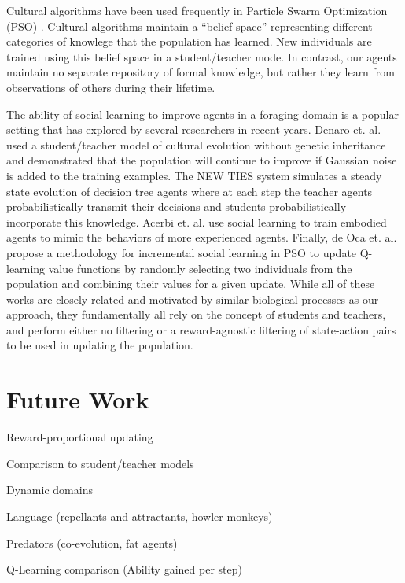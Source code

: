 \documentclass{acm_proc_article-sp}
\begin{document}
Cultural algorithms \cite{reynolds1994introduction} have been used frequently in Particle Swarm Optimization (PSO) \cite{kennedy1995particle}. Cultural algorithms maintain a ``belief space'' representing different categories of knowlege that the population has learned. New individuals are trained using this belief space in a student/teacher mode. In contrast, our agents maintain no separate repository of formal knowledge, but rather they learn from observations of others during their lifetime.

The ability of social learning to improve agents in a foraging domain is a popular setting that has explored by several researchers in recent years. Denaro et. al. \cite{denaro1996cultural} used a student/teacher model of cultural evolution without genetic inheritance and demonstrated that the population will continue to improve if Gaussian noise is added to the training examples. The NEW TIES system \cite{haasdijk2008social, vogt2010modeling} simulates a steady state evolution of decision tree agents where at each step the teacher agents probabilistically transmit their decisions and students probabilistically incorporate this knowledge. Acerbi et. al. \cite{acerbi2007social} use social learning to train embodied agents to mimic the behaviors of more experienced agents. Finally, de Oca et. al. \cite{de2011incremental} propose a methodology for incremental social learning in PSO to update Q-learning \cite{watkins1992q} value functions by randomly selecting two individuals from the population and combining their values for a given update. While all of these works are closely related and motivated by similar biological processes as our approach, they fundamentally all rely on the concept of students and teachers, and perform either no filtering or a reward-agnostic filtering of state-action pairs to be used in updating the population.

\section{Future Work}
\label{sec:future}

Reward-proportional updating

Comparison to student/teacher models

Dynamic domains

Language (repellants and attractants, howler monkeys)

Predators (co-evolution, fat agents)

Q-Learning comparison (Ability gained per step)
\end{document}
